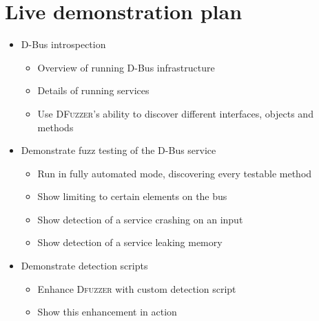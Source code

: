 \documentclass[conference]{IEEEtran}
\begin{document}
\appendix
\section{Live demonstration plan}
\begin{itemize}
	\item D-Bus introspection
		\begin{itemize}
			\item Overview of running D-Bus infrastructure
			\item Details of running services
			\item Use \textsc{DFuzzer}'s ability to discover different interfaces, objects and
			methods
		\end{itemize}
	\item Demonstrate fuzz testing of the D-Bus service
		\begin{itemize}
			\item Run in fully automated mode, discovering every testable method
			\item Show limiting to certain elements on the bus
			\item Show detection of a service crashing on an input
			\item Show detection of a service leaking memory
		\end{itemize}
	\item Demonstrate detection scripts
		\begin{itemize}
			\item Enhance \textsc{Dfuzzer} with custom detection script
			\item Show this enhancement in action
		\end{itemize}
\end{itemize}
\end{document}

